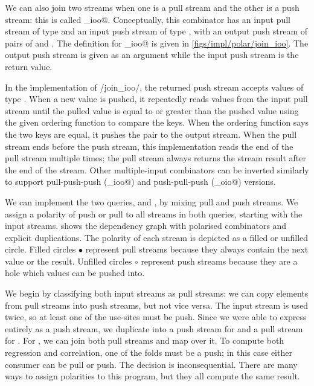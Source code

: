 We can also join two streams when one is a pull stream and the other is a push stream: this is called \Hs@join_ioo@.
Conceptually, this combinator has an input pull stream of type \Hs@a@ and an input push stream of type \Hs@b@, with an output push stream of pairs of \Hs@a@ and \Hs@b@.
The definition for \Hs@join_ioo@ is given in \cref{figs/impl/polar/join_ioo}.
The output push stream is given as an argument while the input push stream is the return value.

In the implementation of \Hs/join_ioo/, the returned push stream accepts values of type \Hs@b@.
When a new value is pushed, it repeatedly reads values from the input pull stream until the pulled value is equal to or greater than the pushed value using the given ordering function to compare the keys.
When the ordering function says the two keys are equal, it pushes the pair to the output stream.
When the pull stream ends before the push stream, this implementation reads the end of the pull stream multiple times; the pull stream always returns the stream result after the end of the stream.
Other multiple-input combinators can be inverted similarly to support pull-push-push (\Hs@_ioo@) and push-pull-push (\Hs@_oio@) versions.

We can implement the two \Hs@priceAnalyses@ queries, \Hs@priceOverTime@ and \Hs@priceOverMarket@, by mixing pull and push streams.
We assign a polarity of push or pull to all streams in both queries, starting with the input streams.
 shows the dependency graph with polarised combinators and explicit duplications.
The polarity of each stream is depicted as a filled or unfilled circle.
Filled circles $\bullet$ represent pull streams because they always contain the next value or the result.
Unfilled circles $\circ$ represent push streams because they are a hole which values can be pushed into.

% 

We begin by classifying both input streams as pull streams: we can copy elements from pull streams into push streams, but not vice versa.
The \Hs@stock@ input stream is used twice, so at least one of the use-sites must be push.
Since we were able to express \Hs@priceOverTime@ entirely as a push stream, we duplicate \Hs@stock@ into a push stream for \Hs@priceOverTime@ and a pull stream for \Hs@priceOverMarket@.
For \Hs@priceOverMarket@, we can join both pull streams and map over it.
To compute both regression and correlation, one of the folds must be a push; in this case either consumer can be pull or push.
The decision is inconsequential.
There are many ways to assign polarities to this program, but they all compute the same result.

